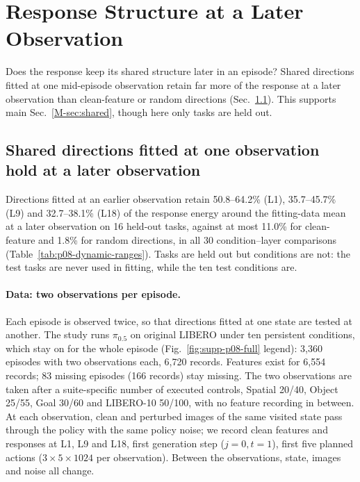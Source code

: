 \section{Response Structure at a Later Observation}
\label{sec:supp-dynamic-visual}
Does the response keep its shared structure later in an episode? Shared directions fitted at one mid-episode observation retain far more of the response at a later observation than clean-feature or random directions (Sec.~\ref{sec:supp-p08-dynamic}). This supports main Sec.~\ref*{M-sec:shared}, though here only tasks are held out.

\subsection{Shared directions fitted at one observation hold at a later observation}
\label{sec:supp-p08-dynamic}
Directions fitted at an earlier observation retain 50.8--64.2\% (L1), 35.7--45.7\% (L9) and 32.7--38.1\% (L18) of the response energy around the fitting-data mean at a later observation on 16 held-out tasks, against at most 11.0\% for clean-feature and 1.8\% for random directions, in all 30 condition--layer comparisons (Table~\ref{tab:p08-dynamic-ranges}). Tasks are held out but conditions are not: the test tasks are never used in fitting, while the ten test conditions are.

\paragraph{Data: two observations per episode.}
Each episode is observed twice, so that directions fitted at one state are tested at another. The study runs $\pi_{0.5}$ on original LIBERO under ten persistent conditions, which stay on for the whole episode (Fig.~\ref{fig:supp-p08-full} legend): 3,360 episodes with two observations each, 6,720 records. Features exist for 6,554 records; 83 missing episodes (166 records) stay missing. The two observations are taken after a suite-specific number of executed controls, Spatial 20/40, Object 25/55, Goal 30/60 and LIBERO-10 50/100, with no feature recording in between. At each observation, clean and perturbed images of the same visited state pass through the policy with the same policy noise; we record clean features and responses at L1, L9 and L18, first generation step ($j=0,t=1$), first five planned actions ($3\times5\times1024$ per observation). Between the observations, state, images and noise all change.

